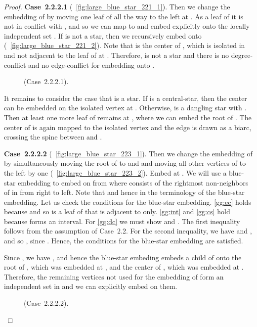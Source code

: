 \documentclass[11pt,a4paper,colorlinks=true,urlcolor=blue,citecolor=red]{article}
\theoremstyle{plain}
\newcommand{\case}[1]{\par\vspace{.5\baselineskip}\noindent\textbf{\sffamily Case~#1}}
\begin{document}
\begin{proof}
  \case{2.2.2.1} 
  (\figurename~\ref{fig:large_blue_star_221_1}). Then we change the
  embedding of  by moving one leaf  of  all the way to
  the left at . As a leaf of  it is not in conflict with ,
  and so we can map  to  and embed  explicitly onto the
  locally independent set . If  is not a star, then we
  recursively embed  onto 
  (\figurename~\ref{fig:large_blue_star_221_2}). Note that  is
  the center of , which is isolated in  and not
  adjacent to the leaf of  at . Therefore,  is
  not a star and there is no degree-conflict and no edge-conflict for
  embedding  onto .
\begin{figure}[htbp]
    \centering\hfil {}\hfil
    \hfil
    \caption{ (Case~2.2.2.1).\label{fig:large_blue_star_221}}
  \end{figure}


  It remains to consider the case that  is a star. If  is a
  central-star, then the center can be embedded on the isolated vertex
  at . Otherwise,  is a dangling star with . Then
  at least one more leaf of  remains at , where we can
  embed the root of . The center of  is again mapped to the
  isolated vertex  and the edge  is drawn as a
  biarc, crossing the spine between  and .

  \case{2.2.2.2} 
  (\figurename~\ref{fig:large_blue_star_223_1}). Then we change the
  embedding of  by simultaneously moving the root of  to  and
  and moving all other vertices of  to the left by one
  (\figurename~\ref{fig:large_blue_star_223_2}). Embed  at . We
  will use a blue-star embedding to embed  on  from
   where  consists of the rightmost 
  non-neighbors of  in  from right to left. Note that
   and hence  in the terminology
  of the blue-star embedding. Let us check the conditions for the
  blue-star embedding. \ref{gg:ec} holds because  and so
   is a leaf of  that is adjacent to  only.
  \ref{gg:int} and \ref{gg:cs} hold because
   forms an interval. For \ref{gg:dc}
  we must show  and
  . The first inequality follows from the
  assumption of Case~2.2. For the second inequality, we have
   and , and so
  , since . Hence, the
  conditions for the blue-star embedding are satisfied.

  Since , we have , and hence the blue-star embeding embeds
  a child of  onto the root of , which was embedded at ,
  and the center of , which was embedded at . Therefore,
  the remaining vertices not used for the embedding of  form an
  independent set in  and we can explicitly embed  on them.
\begin{figure}[htbp]
    \centering\hfil {}\hfil
    \hfil
    \caption{
      (Case~2.2.2.2).\label{fig:large_blue_star_223}}
  \end{figure}



\end{proof}
\end{document}

